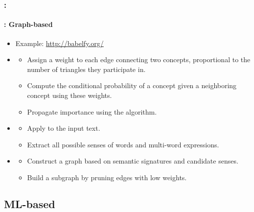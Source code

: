 \documentclass[xcolor=table]{beamer}
\begin{document}
\begin{frame}
	\frametitle{\insertshortsubtitle: \insertsection}
	\framesubtitle{\insertsubsection: Graph-based}
	
	\begin{itemize}
		\item Example: \url{http://babelfy.org/} \cite{2014-moro-al}
		\item {}
		\begin{itemize}
			\item Assign a weight to each edge connecting two concepts, proportional to the number of triangles they participate in.
			\item Compute the conditional probability of a concept given a neighboring concept using these weights.
			\item Propagate importance using the  algorithm.
		\end{itemize}
		\item {}
		\begin{itemize}
			\item Apply  to the input text.
			\item Extract all possible senses of words and multi-word expressions.
		\end{itemize}
		\item {}
		\begin{itemize}
			\item Construct a graph based on semantic signatures and candidate senses.
			\item Build a subgraph by pruning edges with low weights.
		\end{itemize}
	\end{itemize}
	
\end{frame}

\subsection{ML-based}
\end{document}
